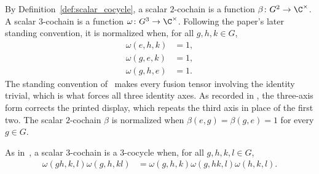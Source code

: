 \begin{definition}
    \label{def:mpug_scalar_cochains}
    \leanok
    By Definition~\ref{def:scalar_cocycle}, a scalar $2$-cochain
    is a function $\beta\colon G^2\to\C^\times$. A scalar $3$-cochain is a
    function $\omega\colon G^3\to\C^\times$. Following the paper's later
    standing convention, it is normalized when, for all $g,h,k\in G$,
    \begin{align}
        \omega(e,h,k) & = 1, \\
        \omega(g,e,k) & = 1, \\
        \omega(g,h,e) & = 1.
        \label{eq:mpug_three_normalized}
    \end{align}
    The standing convention of~\cite{FrancoRubio2025MPUGauging} makes every
    fusion tensor involving the identity trivial, which is what forces all
    three identity axes. As recorded in
    \cite{gap:fbc25_three_cocycle_normalization_typo}, the three-axis form
    corrects the printed display, which repeats the third axis in place of
    the first two.
    The scalar $2$-cochain $\beta$ is normalized when
    $\beta(e,g)=\beta(g,e)=1$ for every $g\in G$.
\end{definition}

\begin{definition}
    \label{def:mpug_three_cocycle}
    \leanok
    As in~\cite{FrancoRubio2025MPUGauging}, a scalar $3$-cochain is a
    $3$-cocycle when, for all $g,h,k,l\in G$,
    \begin{align}
        \omega(gh,k,l)\omega(g,h,kl)
         & =\omega(g,h,k)\omega(g,hk,l)\omega(h,k,l).
        \label{eq:mpug_three_cocycle}
    \end{align}
\end{definition}

